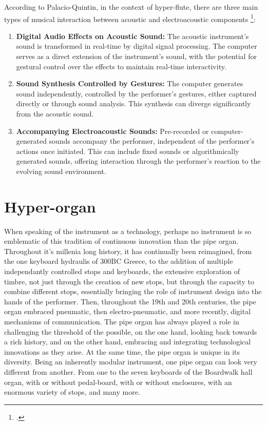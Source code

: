 \documentclass[12pt,twoside,maitrise]{dms_ks}
\theoremstyle{definition}
\begin{document}
According to Palacio-Quintin, in the context of hyper-flute, there are three main types of musical interaction between acoustic and electroacoustic components \footcite[52]{palacio-quintin_composition_2012-1}:

\begin{enumerate}
  \item \textbf{Digital Audio Effects on Acoustic Sound:} The acoustic instrument's sound is transformed in real-time by digital signal processing. 
The computer serves as a direct extension of the instrument's sound, with the potential for gestural control over the effects to maintain real-time interactivity.
  
  \item \textbf{Sound Synthesis Controlled by Gestures:} The computer generates sound independently, controlled by the performer's gestures, either captured directly or through sound analysis. 
This synthesis can diverge significantly from the acoustic sound.
  
  \item \textbf{Accompanying Electroacoustic Sounds:} Pre-recorded or computer-generated sounds accompany the performer, independent of the performer's actions once initiated. 
This can include fixed sounds or algorithmically generated sounds, offering interaction through the performer's reaction to the evolving sound environment.
\end{enumerate}

\section{Hyper-organ}

When speaking of the instrument as a technology, perhaps no instrument is so emblematic of this tradition of continuous innovation than the pipe organ. 
Throughout it's millenia long history, it has continually been reimagined, from the one keyboard hydraulis of 300BC Greece, to the addition of multiple independantly controlled stops and keyboards, the extensive exploration of timbre, not just through the creation of new stops, but through the capacity to combine different stops, essentially bringing the role of instrument design into the hands of the performer. 
Then, throughout the 19th and 20th centuries, the pipe organ embraced pneumatic, then electro-pneumatic, and more recently, digital mechanisms of communication. 
The pipe organ has always played a role in challenging the threshold of the possible, on the one hand, looking back towards a rich history, and on the other hand, embracing and integrating technological innovations as they arise. 
At the same time, the pipe organ is unique in its diversity. 
Being an inherently modular instrument, one pipe organ can look very different from another. 
From one to the seven keyboards of the Boardwalk hall organ, with or without pedal-board, with or without enclosures, with an enormous variety of stops, and many more. 
\end{document}
